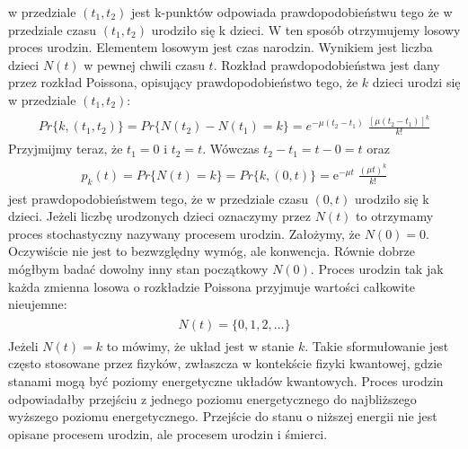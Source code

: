 \documentclass[a4paper,12pt,polish]{sphinxmanual}
\begin{document}
w przedziale $(t_1, t_2)$ jest k-punktów odpowiada prawdopodobieństwu tego że w przedziale
czasu $(t_1, t_2)$ urodziło się k dzieci. W ten sposób otrzymujemy losowy proces urodzin.
Elementem losowym jest czas narodzin. Wynikiem jest liczba dzieci $N(t)$ w pewnej chwili
czasu $t$. Rozkład prawdopodobieństwa jest dany przez rozkład Poissona, opisujący
prawdopodobieństwo tego, że $k$ dzieci urodzi się w przedziale $(t_1,t_2)$:
\label{ch3/chIII021:equation-eqn20}\begin{gather}
\begin{split} Pr\{k,(t_1, t_2)\} = Pr\{N(t_2) - N(t_1) =k\} = e^{-\mu (t_2 - t_1)} \; \frac{[\mu (t_2 - t_1)]^k}{k!}\end{split}\label{ch3/chIII021-eqn20}
\end{gather}
Przyjmijmy teraz, że $t_1 = 0$ i $t_2 =t$. Wówczas $t_2 - t_1 =t-0=t$ oraz
\label{ch3/chIII021:equation-eqn21}\begin{gather}
\begin{split} p_k(t) = Pr\{N(t) = k\} = Pr\{k,(0, t)\} = \mbox{e}^{-\mu t} \; \frac{(\mu t)^k}{k!}\end{split}\label{ch3/chIII021-eqn21}
\end{gather}
jest prawdopodobieństwem tego, że w przedziale czasu $(0, t)$ urodziło się k dzieci. Jeżeli liczbę urodzonych dzieci oznaczymy przez $N(t)$ to otrzymamy proces stochastyczny nazywany procesem urodzin. Założymy, że $N(0) = 0$. Oczywiście nie jest to bezwzględny wymóg, ale konwencja. Równie dobrze mógłbym badać dowolny inny stan początkowy $N(0)$. Proces urodzin tak jak każda zmienna losowa o rozkładzie Poissona przyjmuje wartości całkowite nieujemne:
\label{ch3/chIII021:equation-eqn22}\begin{gather}
\begin{split}N(t) = \{0, 1, 2, \dots\}\end{split}\label{ch3/chIII021-eqn22}
\end{gather}
Jeżeli $N(t) = k$ to mówimy, że układ jest w stanie $k$.
Takie sformułowanie jest często stosowane przez fizyków, zwłaszcza w
kontekście fizyki kwantowej, gdzie stanami mogą być poziomy energetyczne
układów kwantowych. Proces urodzin odpowiadałby przejściu z jednego
poziomu energetycznego do najbliższego wyższego poziomu energetycznego.
Przejście do stanu o niższej energii nie jest opisane procesem urodzin,
ale procesem urodzin i śmierci.
\end{document}
